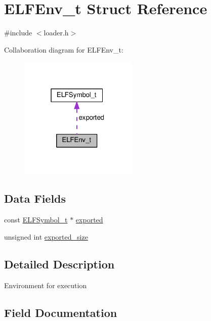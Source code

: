 \hypertarget{structELFEnv__t}{}\section{E\+L\+F\+Env\+\_\+t Struct Reference}
\label{structELFEnv__t}


{\ttfamily \#include $<$loader.\+h$>$}



Collaboration diagram for E\+L\+F\+Env\+\_\+t\+:\nopagebreak
\begin{figure}[H]
\begin{center}
\leavevmode
\includegraphics[width=159pt]{structELFEnv__t__coll__graph}
\end{center}
\end{figure}
\subsection*{Data Fields}
\begin{DoxyCompactItemize}
\item 
const \hyperlink{structELFSymbol__t}{E\+L\+F\+Symbol\+\_\+t} $\ast$ \hyperlink{structELFEnv__t_a8a0bd1705af8b4e31858d52954ded834}{exported}
\item 
unsigned int \hyperlink{structELFEnv__t_a156be6304952c883292044f482a23d8c}{exported\+\_\+size}
\end{DoxyCompactItemize}


\subsection{Detailed Description}
Environment for execution 

\subsection{Field Documentation}

